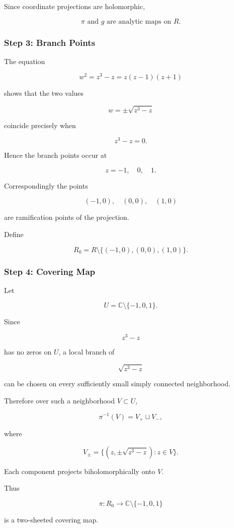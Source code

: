 \documentclass[12pt,a4paper]{article}
\theoremstyle{notespace}
\begin{document}
Since coordinate projections are holomorphic,

\[
\boxed{
	\pi
	\text{ and }
	g
	\text{ are analytic maps on }R.
}
\]

\subsubsection*{Step 3: Branch Points}

The equation

\[
w^2=z^3-z
=
z(z-1)(z+1)
\]

shows that the two values

\[
w=\pm\sqrt{z^3-z}
\]

coincide precisely when

\[
z^3-z=0.
\]

Hence the branch points occur at

\[
z=-1,\quad0,\quad1.
\]

Correspondingly the points

\[
(-1,0),
\quad
(0,0),
\quad
(1,0)
\]

are ramification points of the projection.

Define

\[
R_0
=
R\setminus
\{(-1,0),(0,0),(1,0)\}.
\]

\subsubsection*{Step 4: Covering Map}

Let

\[
U
=
\mathbb C\setminus\{-1,0,1\}.
\]

Since

\[
z^3-z
\]

has no zeros on \(U\), a local branch of

\[
\sqrt{z^3-z}
\]

can be chosen on every sufficiently small simply connected neighborhood.

Therefore over such a neighborhood \(V\subset U\),

\[
\pi^{-1}(V)
=
V_+\sqcup V_-,
\]

where

\[
V_\pm
=
\{(z,\pm\sqrt{z^3-z}):z\in V\}.
\]

Each component projects biholomorphically onto \(V\).

Thus

\[
\boxed{
	\pi:R_0
	\to
	\mathbb C\setminus\{-1,0,1\}
}
\]

is a two-sheeted covering map.
\end{document}
